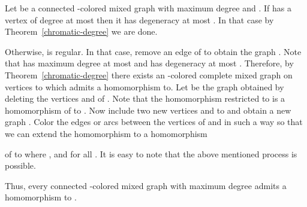 \documentclass[11pt]{article}
\begin{document}
\medskip

Let  be a connected -colored mixed graph with maximum degree  and . 
If  has a vertex of degree at most  then it has degeneracy at most . In that case  by Theorem~\ref{chromatic-degree}
we are done. 

Otherwise,  is  regular. In that case, remove an edge  of  to obtain the graph . Note that  has 
maximum degree at most   and has degeneracy at most . Therefore, by Theorem~\ref{chromatic-degree} there exists an 
-colored complete mixed graph  on 
 vertices to which  admits a  homomorphism to. 
Let  be the graph obtained by deleting the vertices  and  of . Note that the homomorphism  restricted to  is 
 a homomorphism  of  to . Now include two new vertices  and  to  and obtain a new graph . 
Color the edges or arcs between the vertices of  and  in such a way so that we can extend the homomorphism  to a homomorphism
 
of  to   where ,  and  for all . 
It is easy to note that the above mentioned process is possible. 

Thus, every connected -colored mixed graph with maximum degree  admits a homomorphism to . 
\hfill 

   






 
 
\end{document}
